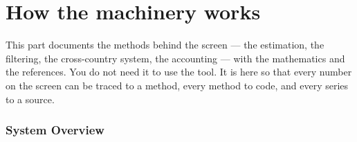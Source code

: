 \documentclass[11pt]{article}
\theoremstyle{definition}
\theoremstyle{remark}
\begin{document}
\clearpage
\part{How the machinery works}\label{part:machinery}

\noindent This part documents the methods behind the screen --- the estimation, the filtering, the
cross-country system, the accounting --- with the mathematics and the references. You do not need it
to use the tool. It is here so that every number on the screen can be traced to a method, every
method to code, and every series to a source.



\section{System Overview}\label{sec:intro}
\end{document}
